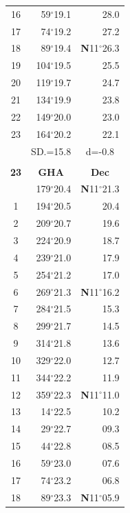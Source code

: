 \documentclass[10pt, a4paper]{report}
\begin{document}
\begin{scriptsize}
\begin{tabular*}{0.2\textwidth}[t]{@{\extracolsep{\fill}}|c|rr|}
16 & 59$^\circ$19.1 & 28.0\\
17 & 74$^\circ$19.2 & 27.2\\[2Pt]
18 & 89$^\circ$19.4 & \textbf{N}11$^\circ$26.3\\
19 & 104$^\circ$19.5 & 25.5\\
20 & 119$^\circ$19.7 & 24.7\\
21 & 134$^\circ$19.9 & \raisebox{0.24ex}{\boldmath$\cdot$~\boldmath$\cdot$~~}23.8\\
22 & 149$^\circ$20.0 & 23.0\\
23 & 164$^\circ$20.2 & 22.1\\
\hline
\rule{0pt}{2.4ex} & \multicolumn{1}{c}{SD.=15.8} & \multicolumn{1}{c|}{d=-0.8}\\
\hline
\multicolumn{1}{c}{}\\[-0.5ex]\hline
\multicolumn{1}{|c|}{\rule{0pt}{2.6ex}\textbf{23}} & \multicolumn{1}{c}{\textbf{GHA}} & \multicolumn{1}{c|}{\textbf{Dec}}\\
\hline\rule{0pt}{2.6ex}\noindent
0 & 179$^\circ$20.4 & \textbf{N}11$^\circ$21.3\\
1 & 194$^\circ$20.5 & 20.4\\
2 & 209$^\circ$20.7 & 19.6\\
3 & 224$^\circ$20.9 & \raisebox{0.24ex}{\boldmath$\cdot$~\boldmath$\cdot$~~}18.7\\
4 & 239$^\circ$21.0 & 17.9\\
5 & 254$^\circ$21.2 & 17.0\\[2Pt]
6 & 269$^\circ$21.3 & \textbf{N}11$^\circ$16.2\\
7 & 284$^\circ$21.5 & 15.3\\
8 & 299$^\circ$21.7 & 14.5\\
9 & 314$^\circ$21.8 & \raisebox{0.24ex}{\boldmath$\cdot$~\boldmath$\cdot$~~}13.6\\
10 & 329$^\circ$22.0 & 12.7\\
11 & 344$^\circ$22.2 & 11.9\\[2Pt]
12 & 359$^\circ$22.3 & \textbf{N}11$^\circ$11.0\\
13 & 14$^\circ$22.5 & 10.2\\
14 & 29$^\circ$22.7 & 09.3\\
15 & 44$^\circ$22.8 & \raisebox{0.24ex}{\boldmath$\cdot$~\boldmath$\cdot$~~}08.5\\
16 & 59$^\circ$23.0 & 07.6\\
17 & 74$^\circ$23.2 & 06.8\\[2Pt]
18 & 89$^\circ$23.3 & \textbf{N}11$^\circ$05.9\\

\end{tabular*}
\end{scriptsize}
\end{document}
